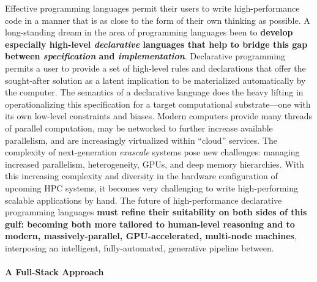 \documentclass[12pt]{article}
\begin{document}
Effective programming languages permit their users to write high-performance code in a manner that is as close to the form of their own thinking as possible. 
A long-standing dream in the area of programming languages been to \textbf{develop especially high-level \emph{declarative} languages that help to bridge this gap between \emph{specification} and \emph{implementation}}. Declarative programming permits a user to provide a set of high-level rules and declarations that offer the sought-after solution as a latent implication to be materialized automatically by the computer. 
The semantics of a declarative language does the heavy lifting in operationalizing this specification for a target computational substrate---one with its own low-level constraints and biases. 
Modern computers provide many threads of parallel computation, may be networked to further increase available parallelism, and are increasingly virtualized within ``cloud'' services. 
The complexity of next-generation \emph{exascale} systems pose new challenges: managing increased parallelism, heterogeneity, GPUs, and deep memory hierarchies. With this increasing complexity and diversity in the hardware configuration of upcoming HPC systems, it becomes very challenging to write high-performing scalable applications by hand.
The future of high-performance declarative programming languages \textbf{must refine their suitability on both sides of this gulf: becoming both more tailored to human-level reasoning and to modern, massively-parallel, GPU-accelerated, multi-node machines}, interposing an intelligent, fully-automated, generative pipeline between.


\paragraph{A Full-Stack Approach}
\end{document}
